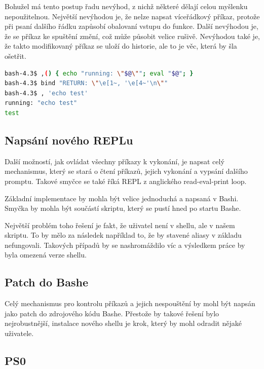 \documentclass[thesis=M,czech]{FITthesis}[2012/06/26]
\begin{document}
Bohužel má tento postup řadu nevýhod, z nichž některé dělají celou myšlenku nepoužitelnou. Největší nevýhodou je, že nelze napsat víceřádkový příkaz, protože při psaní dalšího řádku zapůsobí obalovaní vstupu do funkce. Další nevýhodou je, že se příkaz ke spuštění změní, což může působit velice rušivě. Nevýhodou také je, že takto modifikovaný příkaz se uloží do historie, ale to je věc, která by šla ošetřit.

\begin{lstlisting}[language=bash, caption={Modifikace Readline}, label={lst:readline_hack}]
bash-4.3$ ,() { echo "running: \"$@\""; eval "$@"; }
bash-4.3$ bind "RETURN: \"\e[1~, '\e[4~'\n\""
bash-4.3$ , 'echo test'
running: "echo test"
test
\end{lstlisting}

%
%
\subsection{Napsání nového REPLu}

Další možností, jak ovládat všechny příkazy k vykonání, je napsat celý mechanismus, který se stará o čtení příkazů, jejich vykonání a vypsání dalšího promptu. Takové smyčce se také říká REPL z anglického read-eval-print loop.

Základní implementace by mohla být velice jednoduchá a napsaná v Bashi. Smyčka by mohla být součástí skriptu, který se pustí hned po startu Bashe.

Největší problém toho řešení je fakt, že uživatel není v shellu, ale v našem skriptu. To by mělo za následek například to, že by stavené aliasy v základu nefungovali. Takových případů by se nashromáždilo víc a výsledkem práce by byla omezená verze shellu.


%
%
\subsection{Patch do Bashe}

Celý mechanismus pro kontrolu příkazů a jejich nespouštění by mohl být napsán jako patch do zdrojového kódu Bashe. Přestože by takové řešení bylo nejrobustnější, instalace nového shellu je krok, který by mohl odradit nějaké uživatele.

%
\subsection{PS0}
\end{document}
